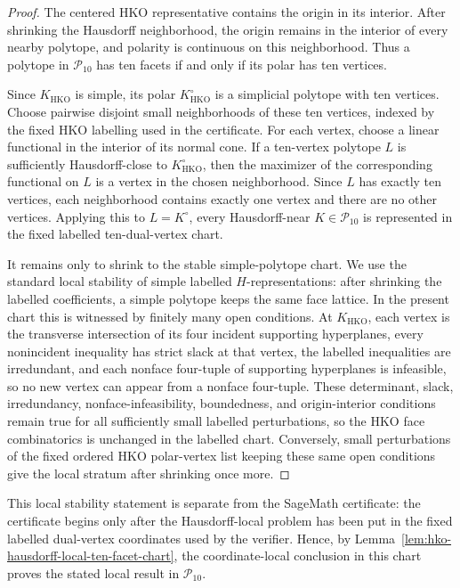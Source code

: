\begin{proof}
The centered HKO representative contains the origin in its interior. After
shrinking the Hausdorff neighborhood, the origin remains in the interior of
every nearby polytope, and polarity is continuous on this neighborhood. Thus a
polytope in \(\mathcal P_{10}\) has ten facets if and only if its polar has ten
vertices.

Since \(K_{\mathrm{HKO}}\) is simple, its polar
\(K_{\mathrm{HKO}}^\circ\) is a simplicial polytope with ten vertices. Choose
pairwise disjoint small neighborhoods of these ten vertices, indexed by the
fixed HKO labelling used in the certificate. For each vertex, choose a linear
functional in the interior of its normal cone. If a ten-vertex polytope \(L\) is
sufficiently Hausdorff-close to \(K_{\mathrm{HKO}}^\circ\), then the maximizer
of the corresponding functional on \(L\) is a vertex in the chosen neighborhood.
Since \(L\) has exactly ten vertices, each neighborhood contains exactly one
vertex and there are no other vertices. Applying this to \(L=K^\circ\), every
Hausdorff-near \(K\in\mathcal P_{10}\) is represented in the fixed labelled
ten-dual-vertex chart.

It remains only to shrink to the stable simple-polytope chart. We use the
standard local stability of simple labelled \(H\)-representations: after
shrinking the labelled coefficients, a simple polytope keeps the same face
lattice. In the present chart this is witnessed by finitely many open
conditions. At \(K_{\mathrm{HKO}}\), each vertex is the transverse intersection
of its four incident supporting hyperplanes, every nonincident inequality has
strict slack at that vertex, the labelled inequalities are irredundant, and
each nonface four-tuple of supporting hyperplanes is infeasible, so no new
vertex can appear from a nonface four-tuple. These determinant, slack,
irredundancy, nonface-infeasibility, boundedness, and origin-interior
conditions remain true for all sufficiently small labelled perturbations, so the
HKO face combinatorics is unchanged in the labelled chart. Conversely, small
perturbations of the fixed ordered HKO polar-vertex list keeping these same open
conditions give the local stratum after shrinking once more.
\end{proof}

This local stability statement is separate from the SageMath certificate: the
certificate begins only after the Hausdorff-local problem has been put in the
fixed labelled dual-vertex coordinates used by the verifier. Hence, by
Lemma~\ref{lem:hko-hausdorff-local-ten-facet-chart}, the coordinate-local
conclusion in this chart proves the stated local result in \(\mathcal P_{10}\).

